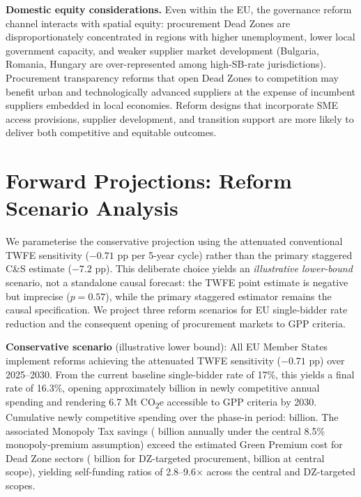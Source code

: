 \documentclass[11pt]{article}
\begin{document}
\textbf{Domestic equity considerations.} Even within the EU, the governance reform channel interacts with spatial equity: procurement Dead Zones are disproportionately concentrated in regions with higher unemployment, lower local government capacity, and weaker supplier market development (Bulgaria, Romania, Hungary are over-represented among high-SB-rate jurisdictions). Procurement transparency reforms that open Dead Zones to competition may benefit urban and technologically advanced suppliers at the expense of incumbent suppliers embedded in local economies. Reform designs that incorporate SME access provisions, supplier development, and transition support are more likely to deliver both competitive and equitable outcomes.

\section{Forward Projections: Reform Scenario Analysis}
\label{sec:forward_projections}

We parameterise the conservative projection using the attenuated conventional TWFE sensitivity ($-0.71$ pp per 5-year cycle) rather than the primary staggered C\&S estimate ($-7.2$ pp). This deliberate choice yields an \textit{illustrative lower-bound} scenario, not a standalone causal forecast: the TWFE point estimate is negative but imprecise ($p = 0.57$), while the primary staggered estimator remains the causal specification. We project three reform scenarios for EU single-bidder rate reduction and the consequent opening of procurement markets to GPP criteria.

\textbf{Conservative scenario} (illustrative lower bound): All EU Member States implement reforms achieving the attenuated TWFE sensitivity ($-0.71$ pp) over 2025--2030. From the current baseline single-bidder rate of 17\%, this yields a final rate of 16.3\%, opening approximately  billion in newly competitive annual spending and rendering 6.7 Mt CO\textsubscript{2}e accessible to GPP criteria by 2030. Cumulative newly competitive spending over the phase-in period:  billion. The associated Monopoly Tax savings ( billion annually under the central 8.5\% monopoly-premium assumption) exceed the estimated Green Premium cost for Dead Zone sectors ( billion for DZ-targeted procurement,  billion at central scope), yielding self-funding ratios of 2.8--9.6$\times$ across the central and DZ-targeted scopes.
\end{document}
